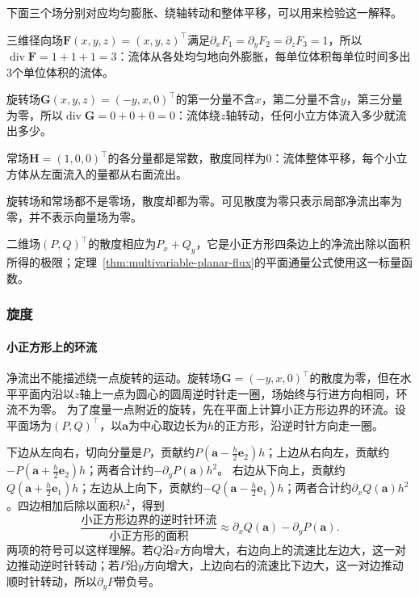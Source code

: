 下面三个场分别对应均匀膨胀、绕轴转动和整体平移，可以用来检验这一解释。
\begin{example}
三维径向场$\bm F(x,y,z)=(x,y,z)^\top$满足$\partial_xF_1=\partial_yF_2=\partial_zF_3=1$，所以$\operatorname{div}\bm F=1+1+1=3$：流体从各处均匀地向外膨胀，每单位体积每单位时间多出$3$个单位体积的流体。

旋转场$\bm G(x,y,z)=(-y,x,0)^\top$的第一分量不含$x$，第二分量不含$y$，第三分量为零，所以$\operatorname{div}\bm G=0+0+0=0$：流体绕$z$轴转动，任何小立方体流入多少就流出多少。

常场$\bm H=(1,0,0)^\top$的各分量都是常数，散度同样为$0$：流体整体平移，每个小立方体从左面流入的量都从右面流出。
\end{example}
旋转场和常场都不是零场，散度却都为零。可见散度为零只表示局部净流出率为零，并不表示向量场为零。

二维场$(P,Q)^\top$的散度相应为$P_x+Q_y$，它是小正方形四条边上的净流出除以面积所得的极限；定理~\ref{thm:multivariable-planar-flux}的平面通量公式使用这一标量函数。

\subsubsection{旋度}

\paragraph{小正方形上的环流}

净流出不能描述绕一点旋转的运动。旋转场$\bm G=(-y,x,0)^\top$的散度为零，但在水平平面内沿以$z$轴上一点为圆心的圆周逆时针走一圈，场始终与行进方向相同，环流不为零。
为了度量一点附近的旋转，先在平面上计算小正方形边界的环流。设平面场为$(P,Q)^\top$，以$\bm a$为中心取边长为$h$的正方形，沿逆时针方向走一圈。

下边从左向右，切向分量是$P$，贡献约$P(\bm a-\tfrac h2\bm e_2)h$；上边从右向左，贡献约$-P(\bm a+\tfrac h2\bm e_2)h$；两者合计约$-\partial_yP(\bm a)h^2$。
右边从下向上，贡献约$Q(\bm a+\tfrac h2\bm e_1)h$；左边从上向下，贡献约$-Q(\bm a-\tfrac h2\bm e_1)h$；两者合计约$\partial_xQ(\bm a)h^2$。四边相加后除以面积$h^2$，得到
\[
 \frac{\text{小正方形边界的逆时针环流}}{\text{小正方形的面积}}
 \approx\partial_xQ(\bm a)-\partial_yP(\bm a).
\]
两项的符号可以这样理解。若$Q$沿$x$方向增大，右边向上的流速比左边大，这一对边推动逆时针转动；若$P$沿$y$方向增大，上边向右的流速比下边大，这一对边推动顺时针转动，所以$\partial_yP$带负号。

